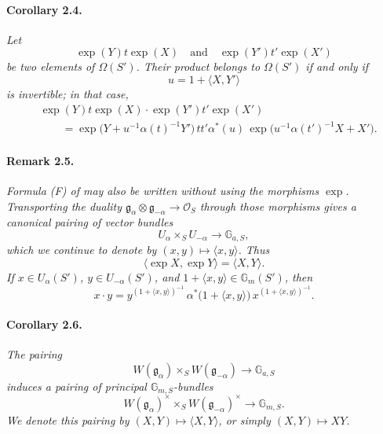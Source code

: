 

\paragraph{\textbf{Corollary 2.4.}}
\emph{Let}
\[
  \exp(Y)t\exp(X)
  \quad\text{and}\quad
  \exp(Y')t'\exp(X')
\]
\emph{be two elements of \(\Omega(S')\). Their product belongs to
\(\Omega(S')\) if and only if}
\[
  u=1+\langle X,Y'\rangle
\]
\emph{is invertible; in that case,}
\begin{equation}\tag{F'}
\begin{split}
  &\exp(Y)t\exp(X)\cdot\exp(Y')t'\exp(X')\\
  &\qquad
   =\exp\bigl(Y+u^{-1}\alpha(t)^{-1}Y'\bigr)\,
      tt'\alpha^\ast(u)\,
      \exp\bigl(u^{-1}\alpha(t')^{-1}X+X'\bigr).
\end{split}
\end{equation}

\paragraph{\textbf{Remark 2.5.}}
\emph{Formula \textup{(F)} of  may also be written
without using the morphisms \(\exp\). Transporting the duality
\(\mathfrak g_\alpha\otimes\mathfrak g_{-\alpha}\to\mathscr O_S\)
through those morphisms gives a canonical pairing of vector
bundles}
\[
  U_\alpha\times_S U_{-\alpha}\longrightarrow\mathbb G_{a,S},
\]
\emph{which we continue to denote by
\((x,y)\mapsto\langle x,y\rangle\). Thus}
\[
  \langle\exp X,\exp Y\rangle=\langle X,Y\rangle.
\]
\emph{If \(x\in U_\alpha(S')\), \(y\in U_{-\alpha}(S')\), and
\(1+\langle x,y\rangle\in\mathbb G_m(S')\), then}
\[
  x\cdot y
   =y^{(1+\langle x,y\rangle)^{-1}}\,
      \alpha^\ast\bigl(1+\langle x,y\rangle\bigr)\,
      x^{(1+\langle x,y\rangle)^{-1}}.
\]

\paragraph{\textbf{Corollary 2.6.}}
\emph{The pairing}
\[
  W(\mathfrak g_\alpha)\times_S W(\mathfrak g_{-\alpha})
    \longrightarrow\mathbb G_{a,S}
\]
\emph{induces a pairing of principal
\(\mathbb G_{m,S}\)-bundles}
\[
  W(\mathfrak g_\alpha)^\times
    \times_S W(\mathfrak g_{-\alpha})^\times
      \longrightarrow\mathbb G_{m,S}.
\]
\emph{We denote this pairing by
\((X,Y)\mapsto\langle X,Y\rangle\), or simply
\((X,Y)\mapsto XY\).}

